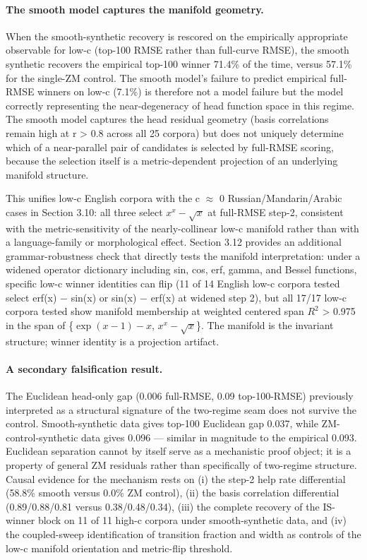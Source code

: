 \documentclass[11pt]{article}
\begin{document}
\paragraph{The smooth model captures the manifold geometry.} When the smooth-synthetic recovery is rescored on the empirically appropriate observable for low-c (top-100 RMSE rather than full-curve RMSE), the smooth synthetic recovers the empirical top-100 winner 71.4\% of the time, versus 57.1\% for the single-ZM control. The smooth model's failure to predict empirical full-RMSE winners on low-c (7.1\%) is therefore not a model failure but the model correctly representing the near-degeneracy of head function space in this regime. The smooth model captures the head residual geometry (basis correlations remain high at r > 0.8 across all 25 corpora) but does not uniquely determine which of a near-parallel pair of candidates is selected by full-RMSE scoring, because the selection itself is a metric-dependent projection of an underlying manifold structure.

This unifies low-c English corpora with the c $\approx$ 0 Russian/Mandarin/Arabic cases in Section 3.10: all three select $x^x-\sqrt{x}$ at full-RMSE step-2, consistent with the metric-sensitivity of the nearly-collinear low-c manifold rather than with a language-family or morphological effect. Section 3.12 provides an additional grammar-robustness check that directly tests the manifold interpretation: under a widened operator dictionary including sin, cos, erf, gamma, and Bessel functions, specific low-c winner identities can flip (11 of 14 English low-c corpora tested select erf(x) − sin(x) or sin(x) − erf(x) at widened step 2), but all 17/17 low-c corpora tested show manifold membership at weighted centered span $R^2$ > 0.975 in the span of \{$\exp(x-1)-x$, $x^x-\sqrt{x}$\}. The manifold is the invariant structure; winner identity is a projection artifact.

\paragraph{A secondary falsification result.} The Euclidean head-only gap (0.006 full-RMSE, 0.09 top-100-RMSE) previously interpreted as a structural signature of the two-regime seam does not survive the control. Smooth-synthetic data gives top-100 Euclidean gap 0.037, while ZM-control-synthetic data gives 0.096 — similar in magnitude to the empirical 0.093. Euclidean separation cannot by itself serve as a mechanistic proof object; it is a property of general ZM residuals rather than specifically of two-regime structure. Causal evidence for the mechanism rests on (i) the step-2 help rate differential (58.8\% smooth versus 0.0\% ZM control), (ii) the basis correlation differential (0.89/0.88/0.81 versus 0.38/0.48/0.34), (iii) the complete recovery of the IS-winner block on 11 of 11 high-c corpora under smooth-synthetic data, and (iv) the coupled-sweep identification of transition fraction and width as controls of the low-c manifold orientation and metric-flip threshold.
\end{document}
